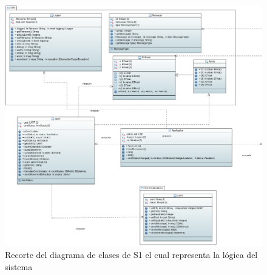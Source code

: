 \begin{figure}[H]
    \centering
    \includegraphics[width=\linewidth]{pictures/S1ClassDiagramLogic.PNG}
    \caption{Recorte del diagrama de clases de \ac{S1} el cual representa la lógica del sistema}
    \label{fig:diagrama_clases_logica_s1}
\end{figure}

